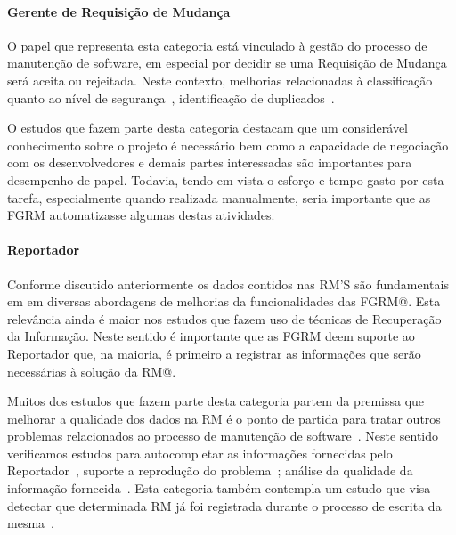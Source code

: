 \paragraph{Gerente de Requisição de	Mudança} O papel que representa esta
categoria está vinculado à gestão do processo de manutenção de software, em
especial por decidir se uma Requisição de Mudança será aceita ou rejeitada.
Neste contexto, melhorias relacionadas à classificação quanto ao nível de
segurança~\cite{gegick2010identifying, zhang2011bug,
	ValdiviaGarcia:2014:CPB:2597073.2597099}, identificação de
duplicados~\cite{hindle2016contextual, sun2010discriminative,
	alipour2013contextual, banerjee2012automated}. 

O estudos que fazem parte desta categoria destacam que um considerável
conhecimento sobre o projeto é necessário bem como  a capacidade de negociação
com os desenvolvedores e demais partes interessadas são importantes para
desempenho de papel. Todavia, tendo em vista o esforço e tempo gasto por esta
tarefa, especialmente quando realizada manualmente, seria importante que as FGRM
automatizasse algumas destas atividades.

\paragraph{Reportador} Conforme discutido anteriormente os dados contidos nas
RM'S são fundamentais em em diversas abordagens de melhorias da funcionalidades
das FGRM@. Esta relevância ainda é maior nos estudos que fazem uso de técnicas
de Recuperação da Informação. Neste sentido é importante que as FGRM deem
suporte ao Reportador que, na maioria, é primeiro a registrar as informações que
serão necessárias à solução da RM@. 

Muitos dos estudos que fazem parte desta categoria  partem da premissa que
melhorar a qualidade dos dados na RM é o ponto de partida para tratar outros
problemas relacionados ao processo de manutenção de
software~\cite{moran2015auto, Moran:2015:EAA:2786805.2807557, Bettenburg2008a}.
Neste sentido verificamos estudos para autocompletar as informações fornecidas
pelo Reportador~\cite{moran2015auto}, suporte a reprodução do
problema~\cite{Moran:2015:EAA:2786805.2807557}; análise da qualidade da
informação fornecida~\cite{Bettenburg2008a, Tu:2014:MQI:2677832.2677844}. Esta
categoria também contempla um estudo que visa detectar que determinada RM já foi
registrada durante o processo de escrita da mesma~\cite{Thung2014}.
